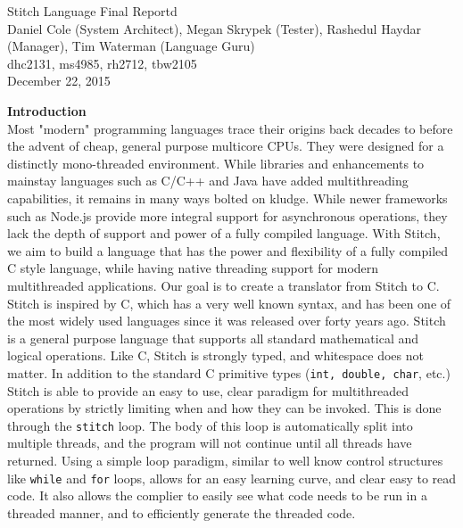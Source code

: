 \documentclass[11pt, oneside]{article}   	%
\date{}							%
\begin{document}
\begin{center}
\LARGE
Stitch Language Final Reportd\\[2em]
\Large 
Daniel Cole (System Architect), Megan Skrypek (Tester), Rashedul Haydar (Manager), Tim Waterman (Language Guru)\\
\large dhc2131, ms4985, rh2712, tbw2105\\[2em]
\normalsize
December 22, 2015\\[3em]
\end{center}

\newpage

\LARGE\textbf{Introduction}\\[2em]
\normalsize
Most "modern" programming languages trace their origins back decades to before the advent of cheap, general purpose multicore CPUs.  They were designed for a distinctly mono-threaded environment.  While libraries and enhancements to mainstay languages such as C/C++ and Java have added multithreading capabilities, it remains in many ways bolted on kludge.  While newer frameworks such as Node.js provide more integral support for asynchronous operations, they lack the depth of support and power of a fully compiled language.  With Stitch, we aim to build a language that has the power and flexibility of a fully compiled C style language, while having native threading support for modern multithreaded applications.  Our goal is to create a translator from Stitch to C.\\[.5em]
Stitch is inspired by C, which has a very well known syntax, and has been one of the most widely used languages since it was released over forty years ago.  Stitch is a general purpose language that supports all standard mathematical and logical operations.  Like C, Stitch is strongly typed, and whitespace does not matter.  In addition to the standard C primitive types (\verb|int, double, char|, etc.)\\[.5em]
Stitch is able to provide an easy to use, clear paradigm for multithreaded operations by strictly limiting when and how they can be invoked.  This is done through the \verb|stitch| loop.  The body of this loop is automatically split into multiple threads, and the program will not continue until all threads have returned.  Using a simple loop paradigm, similar to well know control structures like \verb|while| and \verb|for| loops, allows for an easy learning curve, and clear easy to read code.  It also allows the complier to easily see what code needs to be run in a threaded manner, and to efficiently generate the threaded code.\\[.5em]
\end{document}
